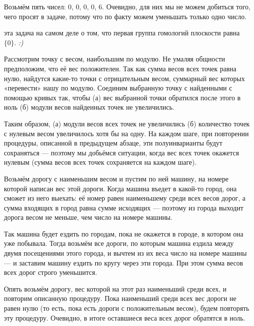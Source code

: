 \begin{itemize}
\itA Возьмём пять чисел: 0, 0, 0, 0, 6. Очевидно, для них мы не можем добиться того, чего просят в задаче, потому что по факту можем уменьшать только одно число.

 эта задача на самом деле о том, что первая группа гомологий плоскости равна $\{0\}$. {\itshape :)}

Рассмотрим точку с весом, наибольшим по модулю. Не умаляя общности предположим, что её вес положителен. Так как сумма весов всех точек равна нулю, найдутся какие-то точки с отрицательным весом, суммарный вес которых «перевести» нашу по модулю. Соединим выбранную точку с найденными с помощью кривых так, чтобы (а) вес выбранной точки обратился после этого в ноль (б) модули весов найденных точек не увеличились.

Таким образом, (а) модули весов всех точек не увеличились (б) количество точек с нулевым весом увеличилось хотя бы на одну. На каждом шаге, при повторении процедуры, описанной в предыдущем абзаце, эти полуинварианты будут сохраняться — поэтому мы добьёмся ситуации, когда вес всех точек окажется нулевым (сумма весов всех точек сохраняется на каждом шаге).

\itC Возьмём дорогу с наименьшим весом и пустим по ней машину, на номере которой написан вес этой дороги. Когда машина въедет в какой-то город, она сможет из него выехать: её номер равен наименьшему среди всех весов дорог, а сумма входящих в город равна сумме исходящих — поэтому из города выходит дорога весом не меньше, чем число на номере машины.

Так машина будет ездить по городам, пока не окажется в городе, в котором она уже побывала. Тогда возьмём все дороги, по которым машина ездила между двумя посещениями этого города, и вычтем из их веса число на номере машины — и заставим машину ездить по кругу через эти города. При этом сумма весов всех дорог строго уменьшится.

Опять возьмём дорогу, вес которой на этот раз наименьший среди всех, и повторим описанную процедуру. Пока наименьший среди всех вес дороги не равен нулю (то есть, пока есть дороги с положительным весом), будем повторять эту процедуру. Очевидно, в итоге оставшиеся веса всех дорог обратятся в ноль.
\end{itemize}